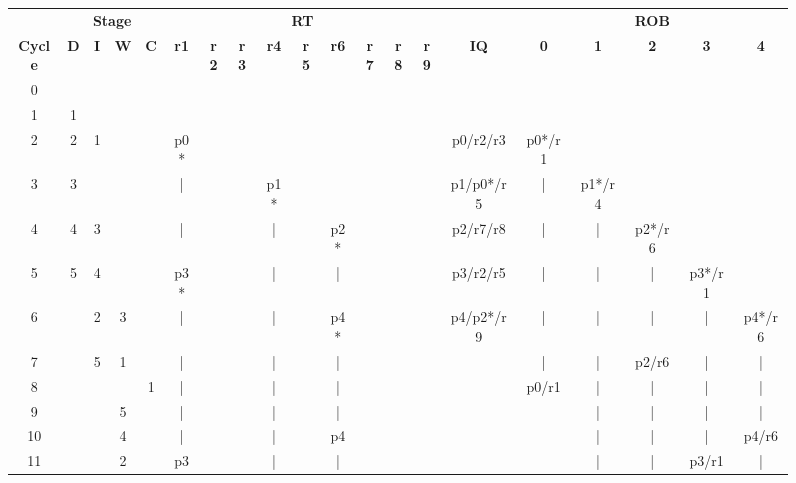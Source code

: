 \documentclass[10pt]{article}
\begin{document}
\begin{figure}[H]
\centering
{\setlength{\tabcolsep}{2pt}
\begin{tabular}{@{\extracolsep{3pt}}cccccccccccccccccccc@{}}
\hline
& \multicolumn{4}{c}{\textbf{Stage}} & \multicolumn{9}{c}{\textbf{RT}} & & \multicolumn{5}{c}{\textbf{ROB}}\\
\cline{2-5}
\cline{6-14}
\cline{16-20}
\textbf{Cycle} & \textbf{D} & \textbf{I} & \textbf{W} & \textbf{C} & \textbf{r1} & \textbf{r2} & \textbf{r3} & \textbf{r4} & \textbf{r5} & \textbf{r6} & \textbf{r7} & \textbf{r8} & \textbf{r9} & \textbf{IQ} & \textbf{0} & \textbf{1} & \textbf{2} & \textbf{3} & \textbf{4} \\ \hline
0 &   &   &   &   &    &    &    &    &    &    &    &    &    &           &        &        &        &        &        \\ \hline
1 & 1 &   &   &   &    &    &    &    &    &    &    &    &    &           &        &        &        &        &        \\ \hline
2 & 2 & 1 &   &   & p0*&    &    &    &    &    &    &    &    & p0/r2/r3  & p0*/r1 &        &        &        &        \\ \hline
3 & 3 &   &   &   &  | &    &    & p1*&    &    &    &    &    & p1/p0*/r5 &   |    & p1*/r4 &        &        &        \\ \hline
4 & 4 & 3 &   &   &  | &    &    &  | &    & p2*&    &    &    & p2/r7/r8  &   |    &   |    & p2*/r6 &        &        \\ \hline
5 & 5 & 4 &   &   & p3*&    &    &  | &    &  | &    &    &    & p3/r2/r5  &   |    &   |    &   |    & p3*/r1 &        \\ \hline
6 &   & 2 & 3 &   &  | &    &    &  | &    & p4*&    &    &    & p4/p2*/r9 &   |    &   |    &   |    &   |    & p4*/r6 \\ \hline
7 &   & 5 & 1 &   &  | &    &    &  | &    &  | &    &    &    &           &   |    &   |    & p2/r6  &   |    &   |    \\ \hline
8 &   &   &   & 1 &  | &    &    &  | &    &  | &    &    &    &           & p0/r1  &   |    &   |    &   |    &   |    \\ \hline
9 &   &   & 5 &   &  | &    &    &  | &    &  | &    &    &    &           &        &   |    &   |    &   |    &   |    \\ \hline
10&   &   & 4 &   &  | &    &    &  | &    & p4 &    &    &    &           &        &   |    &   |    &   |    & p4/r6  \\ \hline
11&   &   & 2 &   & p3 &    &    &  | &    &  | &    &    &    &           &        &   |    &   |    & p3/r1  &   |    \\ \hline

\end{tabular}}
\end{figure}
\end{document}
